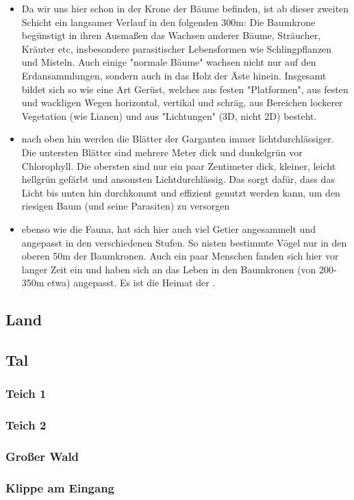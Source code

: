 \begin{itemize}
	\item Da wir uns hier schon in der Krone der Bäume befinden, ist ab dieser zweiten Schicht ein langsamer Verlauf in den folgenden 300m: Die Baumkrone begünstigt in ihren Ausmaßen das Wachsen anderer Bäume, Sträucher, Kräuter etc, insbesondere parasitischer Lebensformen wie Schlingpflanzen und Misteln. Auch einige "normale Bäume" wachsen nicht nur auf den Erdansammlungen, sondern auch in das Holz der Äste hinein. Insgesamt bildet sich so wie eine Art Gerüst, welches aus festen "Platformen", aus festen und wackligen Wegen horizontal, vertikal und schräg, aus Bereichen lockerer Vegetation (wie Lianen) und aus "Lichtungen" (3D, nicht 2D) besteht.
	\item nach oben hin werden die Blätter der Garganten immer lichtdurchlässiger. Die untersten Blätter sind mehrere Meter dick und dunkelgrün vor Chlorophyll. Die obersten sind nur ein paar Zentimeter dick, kleiner, leicht hellgrün gefärbt und ansonsten Lichtdurchlässig. Das sorgt dafür, dass das Licht bis unten hin durchkommt und effizient genutzt werden kann, um den riesigen Baum (und seine Parasiten) zu versorgen
	\item ebenso wie die Fauna, hat sich hier auch viel Getier angesammelt und angepasst in den verschiedenen Stufen. So nisten bestimmte Vögel nur in den oberen 50m der Baumkronen. Auch ein paar Menschen fanden sich hier vor langer Zeit ein und haben sich an das Leben in den Baumkronen (von 200-350m etwa) angepasst. Es ist die Heimat der .
\end{itemize}

\subsection{Land}
\subsection{Tal}
\subsubsection{Teich 1}
\subsubsection{Teich 2}
\subsubsection{Großer Wald}
\subsubsection{Klippe am Eingang}

